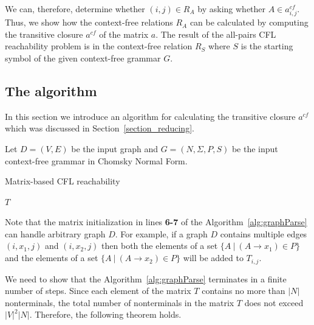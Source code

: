 \documentclass[runningheads,a4paper]{llncs}
\begin{document}
We can, therefore, determine whether $(i,j) \in R_A$ by asking whether $A \in a^{cf}_{i,j}$. Thus, we show how the context-free relations $R_A$ can be calculated by computing the transitive closure $a^{cf}$ of the matrix $a$. The result of the all-pairs CFL reachability problem is in the context-free relation $R_S$ where $S$ is the starting symbol of the given context-free grammar $G$.



\subsection{The algorithm} \label{section_algorithm}
In this section we introduce an algorithm for calculating the transitive closure $a^{cf}$ which was discussed in Section~\ref{section_reducing}.

Let $D = (V, E)$ be the input graph and $G = (N,\Sigma,P,S)$ be the input context-free grammar in Chomsky Normal Form.

\begin{algorithm}[H]
	\begin{algorithmic}[1]
		\caption{Matrix-based CFL reachability}
		\label{alg:graphParse}
		
		\EndFor    
		
		\EndWhile
		\State \Return $T$
		\EndFunction
	\end{algorithmic}
\end{algorithm}

Note that the matrix initialization in lines \textbf{6-7} of the Algorithm~\ref{alg:graphParse} can handle arbitrary graph $D$. For example, if a graph $D$ contains multiple edges $(i,x_1,j)$ and $(i,x_2,j)$ then both the elements of a set $\{A~|~(A \rightarrow x_1) \in P \}$ and the elements of a set $\{A~|~(A \rightarrow x_2) \in P \}$ will be added to $T_{i,j}$.

We need to show that the Algorithm~\ref{alg:graphParse} terminates in a finite number of steps. Since each element of the matrix $T$ contains no more than $|N|$ nonterminals, the total number of nonterminals in the matrix $T$ does not exceed $|V|^2|N|$. Therefore, the following theorem holds.
\end{document}
